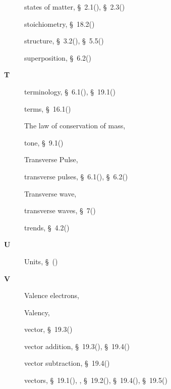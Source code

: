 \begin{multicols}{2}
{\begin{description}
	  \item[] \noindent\raggedright states of matter,  \S~2.1(\pageref{m38736}),  \S~2.3(\pageref{m38730})
	  \item[] \noindent\raggedright stoichiometry,  \S~18.2(\pageref{m38712})
	  \item[] \noindent\raggedright structure,  \S~3.2(\pageref{m38745}),  \S~5.5(\pageref{m38689})
	  \item[] \noindent\raggedright superposition,  \S~6.2(\pageref{m38802})
	  \vspace{.3cm}
	  \item[{\large \bfseries T}]\noindent\raggedright
	  terminology,  \S~6.1(\pageref{m38801}),  \S~19.1(\pageref{m38812})
	  \item[] \noindent\raggedright terms,  \S~16.1(\pageref{m38771})
	  \item[] \noindent\raggedright The law of conservation of mass,  \pageref{id2463440}
	  \item[] \noindent\raggedright tone,  \S~9.1(\pageref{m38799})
	  \item[] \noindent\raggedright Transverse Pulse,  \pageref{id2434870}
	  \item[] \noindent\raggedright transverse pulses,  \S~6.1(\pageref{m38801}),  \S~6.2(\pageref{m38802})
	  \item[] \noindent\raggedright Transverse wave,  \pageref{id2438862}
	  \item[] \noindent\raggedright transverse waves,  \S~7(\pageref{m38806})
	  \item[] \noindent\raggedright trends,  \S~4.2(\pageref{m38757})
	  \vspace{.3cm}
	  \item[{\large \bfseries U}]\noindent\raggedright
	  Units,  \S~(\pageref{m30853})
	  \vspace{.3cm}
	  \item[{\large \bfseries V}]\noindent\raggedright
	  Valence electrons,  \pageref{id2421518}
	  \item[] \noindent\raggedright Valency,  \pageref{id2427205}
	  \item[] \noindent\raggedright vector,  \S~19.3(\pageref{m38815})
	  \item[] \noindent\raggedright vector addition,  \S~19.3(\pageref{m38815}),  \S~19.4(\pageref{m38816})
	  \item[] \noindent\raggedright vector subtraction,  \S~19.4(\pageref{m38816})
	  \item[] \noindent\raggedright vectors,  \S~19.1(\pageref{m38812}),  \pageref{id2510284},  \S~19.2(\pageref{m38813}),  \S~19.4(\pageref{m38816}),  \S~19.5(\pageref{m38819})

\end{description}}
\end{multicols}
